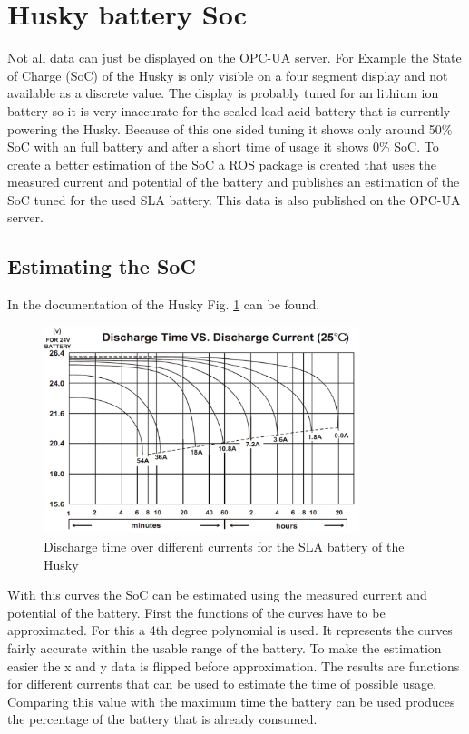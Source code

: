 \documentclass[conference]{IEEEtran}
\begin{document}
\section{Husky battery Soc}
Not all data can just be displayed on the OPC-UA server.
For Example the State of Charge (SoC) of the Husky is only visible on a four segment display and not available as a discrete value.
The display is probably tuned for an lithium ion battery so it is very inaccurate for the sealed lead-acid battery that is currently powering the Husky.
Because of this one sided tuning it shows only around 50\% SoC with an full battery and after a short time of usage it shows 0\% SoC.
To create a better estimation of the SoC a ROS package is created that uses the measured current and potential of the battery and publishes an estimation of the SoC tuned for the used SLA battery.
This data is also published on the OPC-UA server.
\subsection{Estimating the SoC}
In the documentation of the Husky Fig. \ref{fig:EndladekuvenSLA} can be found.\\

\begin{figure}[htbp]
    \centerline{\includegraphics[width=9.2cm]{Pictures/EndladekuvenSLA.png}}
    \caption{Discharge time over different currents for the SLA battery of the Husky \cite[p.21]{SLAKurven}}
    \label{fig:EndladekuvenSLA}
\end{figure}
With this curves the SoC can be estimated using the measured current and potential of the battery.
First the functions of the curves have to be approximated. For this a 4th degree polynomial is used.
It represents the curves fairly accurate within the usable range of the battery.
To make the estimation easier the x and y data is flipped before approximation.
The results are functions for different currents that can be used to estimate the time of possible usage.
Comparing this value with the maximum time the battery can be used produces the percentage of the battery that is already consumed.
\end{document}
